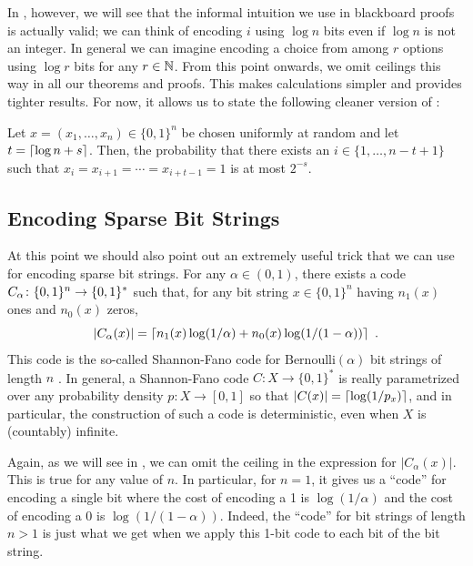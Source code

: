 \documentclass{patmorin}
\newenvironment{customthm}[1]
  {\renewcommand\theinnercustomthm{#1}\innercustomthm}
  {\endinnercustomthm}
\begin{document}
In , however, we will see that the informal intuition we
use in blackboard proofs is actually valid; we can think of encoding
$i$ using $\log n$ bits even if $\log n$ is not an integer.  In
general we can imagine encoding a choice from among $r$ options using
$\log r$ bits for any $r\in\mathbb{N}$.  From this point onwards, we omit
ceilings this way in all our theorems and proofs. This makes
calculations simpler and provides tighter results.  For now, it allows
us to state the following cleaner version of :

\begin{customthm}{\ref*{thm:runs-i}b}
  Let $x=(x_1,\ldots,x_n)\in\{0,1\}^n$ be chosen uniformly at random
  and let $t = {\lceil \log n + s \rceil}$. Then, the probability that there
  exists an $i\in\{1,\ldots,n-t+1\}$ such that
  $x_i=x_{i+1}=\cdots=x_{i+t-1}=1$ is at most $2^{-s}$.
\end{customthm}

\subsection{Encoding Sparse Bit Strings}

At this point we should also point out an extremely useful trick that
we can use for encoding sparse bit strings. For any $\alpha\in(0,1)$,
there exists a code $C_\alpha\colon \{0,1\}^n\rightarrow \{0,1\}^*$
such that, for any bit string $x\in\{0,1\}^n$ having $n_1(x)$ ones and
$n_0(x)$ zeros,
\begin{equation}
  |C_\alpha(x)| = \lceil n_1(x)\log(1/\alpha) + n_0(x)\log(1/(1-\alpha)) \rceil \enspace .
  \eqlabel{sparse-bitstring-i}
\end{equation}
This code is the so-called Shannon-Fano code for
$\mathrm{Bernoulli}(\alpha)$ bit strings of length $n$
\cite{fano:transmission,shannon:mathematical}. In general, a
Shannon-Fano code $C : X \to \{0, 1\}^*$ is really parametrized over
any probability density $p : X \to [0, 1]$ so that $|C(x)| =
{\lceil \log (1/p_x) \rceil}$, and in particular, the construction of such a
code is deterministic, even when $X$ is (countably) infinite.

Again, as we will see in , we can omit the ceiling in the
expression for $|C_\alpha(x)|$.  This is true for any value of $n$. In
particular, for $n=1$, it gives us a ``code'' for encoding a single
bit where the cost of encoding a 1 is $\log(1/\alpha)$ and the cost of
encoding a 0 is $\log(1/(1-\alpha))$.  Indeed, the ``code'' for bit
strings of length $n>1$ is just what we get when we apply this 1-bit
code to each bit of the bit string.
\end{document}
